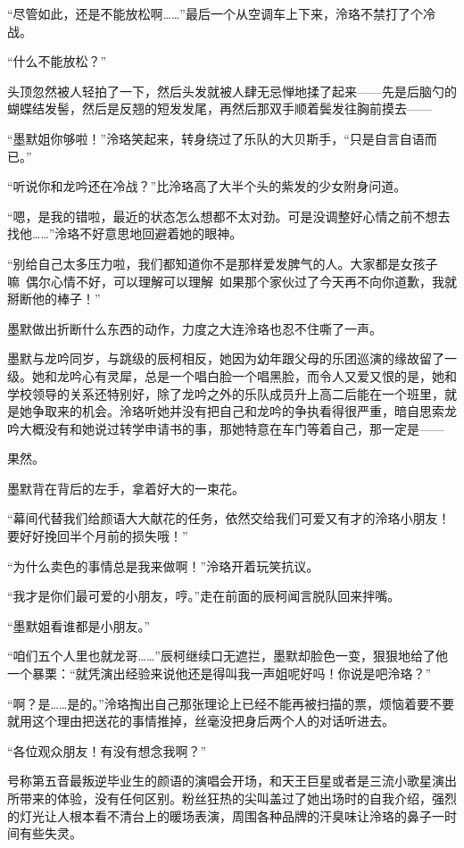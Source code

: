 \documentclass[UTF8, scheme = chinese, openany]{ctexbook}
\begin{document}
“尽管如此，还是不能放松啊……”最后一个从空调车上下来，泠珞不禁打了个冷战。

“什么不能放松？”

头顶忽然被人轻拍了一下，然后头发就被人肆无忌惮地揉了起来——先是后脑勺的蝴蝶结发髻，然后是反翘的短发发尾，再然后那双手顺着鬓发往胸前摸去——

“墨默姐你够啦！”泠珞笑起来，转身绕过了乐队的大贝斯手，“只是自言自语而已。”

“听说你和龙吟还在冷战？”比泠珞高了大半个头的紫发的少女附身问道。

“嗯，是我的错啦，最近的状态怎么想都不太对劲。可是没调整好心情之前不想去找他……”泠珞不好意思地回避着她的眼神。

“别给自己太多压力啦，我们都知道你不是那样爱发脾气的人。大家都是女孩子嘛~偶尔心情不好，可以理解可以理解~如果那个家伙过了今天再不向你道歉，我就掰断他的棒子！”

墨默做出折断什么东西的动作，力度之大连泠珞也忍不住嘶了一声。

墨默与龙吟同岁，与跳级的辰柯相反，她因为幼年跟父母的乐团巡演的缘故留了一级。她和龙吟心有灵犀，总是一个唱白脸一个唱黑脸，而令人又爱又恨的是，她和学校领导的关系还特别好，除了龙吟之外的乐队成员升上高二后能在一个班里，就是她争取来的机会。泠珞听她并没有把自己和龙吟的争执看得很严重，暗自思索龙吟大概没有和她说过转学申请书的事，那她特意在车门等着自己，那一定是——

果然。

墨默背在背后的左手，拿着好大的一束花。

“幕间代替我们给颜语大大献花的任务，依然交给我们可爱又有才的泠珞小朋友！要好好挽回半个月前的损失哦！”

“为什么卖色的事情总是我来做啊！”泠珞开着玩笑抗议。

“我才是你们最可爱的小朋友，哼。”走在前面的辰柯闻言脱队回来拌嘴。

“墨默姐看谁都是小朋友。”

“咱们五个人里也就龙哥……”辰柯继续口无遮拦，墨默却脸色一变，狠狠地给了他一个暴栗：“就凭演出经验来说他还是得叫我一声姐呢好吗！你说是吧泠珞？”

“啊？是……是的。”泠珞掏出自己那张理论上已经不能再被扫描的票，烦恼着要不要就用这个理由把送花的事情推掉，丝毫没把身后两个人的对话听进去。

“各位观众朋友！有没有想念我啊？”

号称第五音最叛逆毕业生的颜语的演唱会开场，和天王巨星或者是三流小歌星演出所带来的体验，没有任何区别。粉丝狂热的尖叫盖过了她出场时的自我介绍，强烈的灯光让人根本看不清台上的暖场表演，周围各种品牌的汗臭味让泠珞的鼻子一时间有些失灵。
\end{document}

